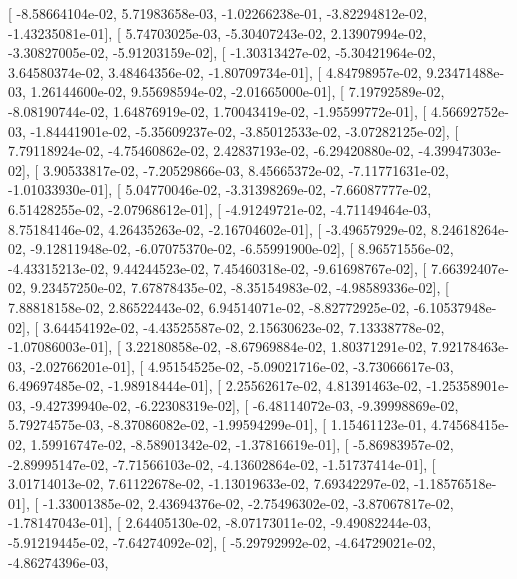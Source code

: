 \documentclass{article}
\begin{document}
       [ -8.58664104e-02,   5.71983658e-03,  -1.02266238e-01,
         -3.82294812e-02,  -1.43235081e-01],
       [  5.74703025e-03,  -5.30407243e-02,   2.13907994e-02,
         -3.30827005e-02,  -5.91203159e-02],
       [ -1.30313427e-02,  -5.30421964e-02,   3.64580374e-02,
          3.48464356e-02,  -1.80709734e-01],
       [  4.84798957e-02,   9.23471488e-03,   1.26144600e-02,
          9.55698594e-02,  -2.01665000e-01],
       [  7.19792589e-02,  -8.08190744e-02,   1.64876919e-02,
          1.70043419e-02,  -1.95599772e-01],
       [  4.56692752e-03,  -1.84441901e-02,  -5.35609237e-02,
         -3.85012533e-02,  -3.07282125e-02],
       [  7.79118924e-02,  -4.75460862e-02,   2.42837193e-02,
         -6.29420880e-02,  -4.39947303e-02],
       [  3.90533817e-02,  -7.20529866e-03,   8.45665372e-02,
         -7.11771631e-02,  -1.01033930e-01],
       [  5.04770046e-02,  -3.31398269e-02,  -7.66087777e-02,
          6.51428255e-02,  -2.07968612e-01],
       [ -4.91249721e-02,  -4.71149464e-03,   8.75184146e-02,
          4.26435263e-02,  -2.16704602e-01],
       [ -3.49657929e-02,   8.24618264e-02,  -9.12811948e-02,
         -6.07075370e-02,  -6.55991900e-02],
       [  8.96571556e-02,  -4.43315213e-02,   9.44244523e-02,
          7.45460318e-02,  -9.61698767e-02],
       [  7.66392407e-02,   9.23457250e-02,   7.67878435e-02,
         -8.35154983e-02,  -4.98589336e-02],
       [  7.88818158e-02,   2.86522443e-02,   6.94514071e-02,
         -8.82772925e-02,  -6.10537948e-02],
       [  3.64454192e-02,  -4.43525587e-02,   2.15630623e-02,
          7.13338778e-02,  -1.07086003e-01],
       [  3.22180858e-02,  -8.67969884e-02,   1.80371291e-02,
          7.92178463e-03,  -2.02766201e-01],
       [  4.95154525e-02,  -5.09021716e-02,  -3.73066617e-03,
          6.49697485e-02,  -1.98918444e-01],
       [  2.25562617e-02,   4.81391463e-02,  -1.25358901e-03,
         -9.42739940e-02,  -6.22308319e-02],
       [ -6.48114072e-03,  -9.39998869e-02,   5.79274575e-03,
         -8.37086082e-02,  -1.99594299e-01],
       [  1.15461123e-01,   4.74568415e-02,   1.59916747e-02,
         -8.58901342e-02,  -1.37816619e-01],
       [ -5.86983957e-02,  -2.89995147e-02,  -7.71566103e-02,
         -4.13602864e-02,  -1.51737414e-01],
       [  3.01714013e-02,   7.61122678e-02,  -1.13019633e-02,
          7.69342297e-02,  -1.18576518e-01],
       [ -1.33001385e-02,   2.43694376e-02,  -2.75496302e-02,
         -3.87067817e-02,  -1.78147043e-01],
       [  2.64405130e-02,  -8.07173011e-02,  -9.49082244e-03,
         -5.91219445e-02,  -7.64274092e-02],
       [ -5.29792992e-02,  -4.64729021e-02,  -4.86274396e-03,
\end{document}
